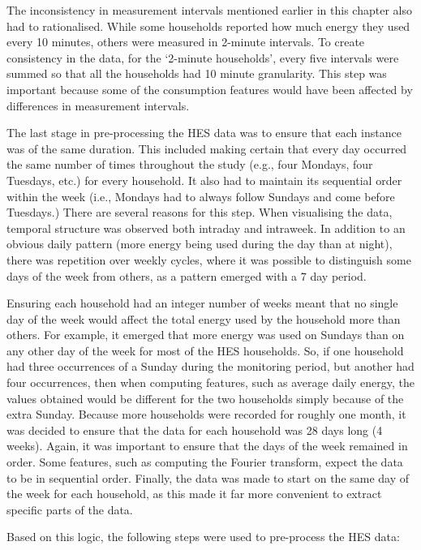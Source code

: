 The inconsistency in measurement intervals mentioned earlier in this chapter also had to rationalised. While some households reported how much energy they used every 10 minutes, others were measured in 2-minute intervals. To create consistency in the data, for the `2-minute households', every five intervals were summed so that all the households had 10 minute granularity. This step was important because some of the consumption features would have been affected by differences in measurement intervals. 

The last stage in pre-processing the HES data was to ensure that each instance was of the same duration.  This included making certain that every day occurred the same number of times throughout the study (e.g., four Mondays, four Tuesdays, etc.) for every household.  It also had to maintain its sequential order within the week (i.e., Mondays had to always follow Sundays and come before Tuesdays.)  There are several reasons for this step.  When visualising the data, temporal structure was observed both intraday and intraweek. In addition to an obvious daily pattern (more energy being used during the day than at night), there was repetition over weekly cycles, where it was possible to distinguish some days of the week from others, as a pattern emerged with a 7 day period.  

Ensuring each household had an integer number of weeks meant that no single day of the week would affect the total energy used by the household more than others. For example, it emerged that more energy was used on Sundays than on any other day of the week for most of the HES households. So, if one household had three occurrences of a Sunday during the monitoring period, but another had four occurrences, then when computing features, such as average daily energy, the values obtained would be different for the two households simply because of the extra Sunday. Because more households were recorded for roughly one month, it was decided to ensure that the data for each household was 28 days long (4 weeks). Again, it was important to ensure that the days of the week remained in order. Some features, such as computing the Fourier transform, expect the data to be in sequential order. Finally, the data was made to start on the same day of the week for each household, as this made it far more convenient to extract specific parts of the data.

Based on this logic, the following steps were used to pre-process the HES data:

